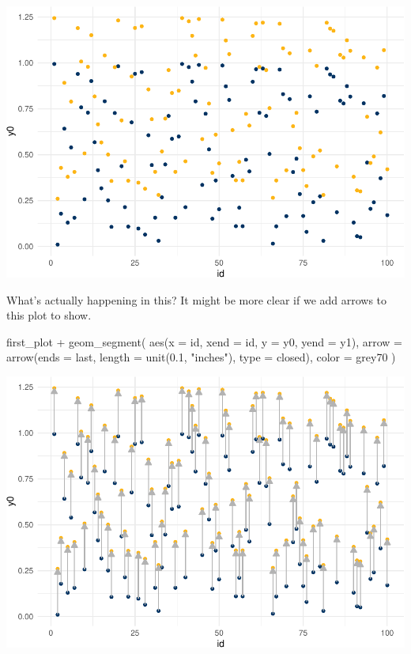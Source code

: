 \documentclass[
]{article}
\newenvironment{Shaded}{\begin{snugshade}}{\end{snugshade}}
\newcommand{\AttributeTok}[1]{\textcolor[rgb]{0.77,0.63,0.00}{#1}}
\newcommand{\FloatTok}[1]{\textcolor[rgb]{0.00,0.00,0.81}{#1}}
\newcommand{\FunctionTok}[1]{\textcolor[rgb]{0.00,0.00,0.00}{#1}}
\newcommand{\NormalTok}[1]{#1}
\newcommand{\SpecialCharTok}[1]{\textcolor[rgb]{0.00,0.00,0.00}{#1}}
\newcommand{\StringTok}[1]{\textcolor[rgb]{0.31,0.60,0.02}{#1}}
\begin{document}
\includegraphics{241-live-session_files/figure-latex/create first plot-1.pdf}

What's actually happening in this? It might be more clear if we add arrows to this plot to show.

\begin{Shaded}
\begin{Highlighting}[]
\NormalTok{first\_plot }\SpecialCharTok{+}
  \FunctionTok{geom\_segment}\NormalTok{(}
    \FunctionTok{aes}\NormalTok{(}\AttributeTok{x =}\NormalTok{ id, }\AttributeTok{xend =}\NormalTok{ id, }\AttributeTok{y =}\NormalTok{ y0, }\AttributeTok{yend =}\NormalTok{ y1), }
    \AttributeTok{arrow =} \FunctionTok{arrow}\NormalTok{(}\AttributeTok{ends =} \StringTok{\textquotesingle{}last\textquotesingle{}}\NormalTok{, }\AttributeTok{length =} \FunctionTok{unit}\NormalTok{(}\FloatTok{0.1}\NormalTok{, }\StringTok{"inches"}\NormalTok{), }\AttributeTok{type =} \StringTok{\textquotesingle{}closed\textquotesingle{}}\NormalTok{), }
    \AttributeTok{color =} \StringTok{\textquotesingle{}grey70\textquotesingle{}}
\NormalTok{    )}
\end{Highlighting}
\end{Shaded}

\includegraphics{241-live-session_files/figure-latex/show the movement between potential outcomes-1.pdf}
\end{document}

